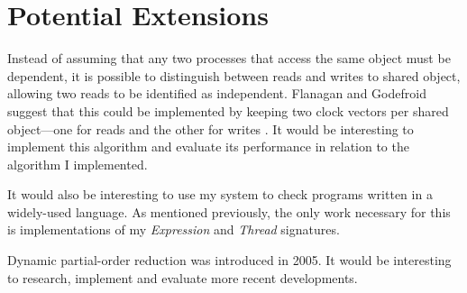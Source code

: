 \documentclass[12pt,a4paper,twoside,openright]{report}
\begin{document}
\section{Potential Extensions}
Instead of assuming that any
two processes that access the
same object must be dependent,
it is possible to distinguish
between reads and writes to
shared object, allowing
two reads to be identified
as independent.
Flanagan and Godefroid suggest
that this could be implemented
by keeping two clock vectors per
shared object---one for reads and
the other for writes \cite{flan05}.
It would
be interesting to implement
this algorithm and evaluate its
performance in relation to the
algorithm I implemented.

It would also be interesting
to use my system to check
programs written in a widely-used
language. As mentioned previously,
the only work necessary for this
is implementations of my
\textit{Expression} and
\textit{Thread} signatures.

Dynamic partial-order reduction
was introduced in 2005. It would
be interesting to research,
implement and evaluate more
recent developments.



\appendix
\end{document}
